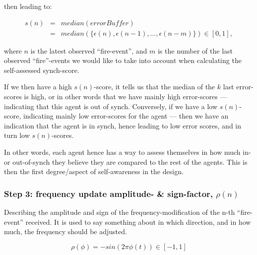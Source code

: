 	then leading to:
	
	\begin{equation}
	\label{self_assessed_synch}
		\begin{array}{rrclcl}
		s(n) & = & median(errorBuffer) \\ 
		& = & median(\{\epsilon(n), \epsilon(n-1), ... , \epsilon(n-m)\}) \in [0, 1],
		\end{array}
	\end{equation} \nl
	
	where $n$ is the latest observed ``fire-event'', and $m$ is the number of the last observed ``fire''-events we would like to take into account when calculating the self-assessed synch-score.
	
	If we then have a high $s(n)$-score, it tells us that the median of the $k$ last error-scores is high, or in other words that we have mainly high error-scores — indicating that this agent is out of synch. Conversely, if we have a low $s(n)$-score, indicating mainly low error-scores for the agent — then we have an indication that the agent is in synch, hence leading to low error scores, and in turn low $s(n)$-scores. 
	
	In other words, each agent hence has a way to assess themselves in how much in- or out-of-synch they believe they are compared to the rest of the agents. This is then the first degree/aspect of  self-awareness in the design.
	
	\subsubsection{Step 3: frequency update amplitude- \& sign-factor, $\rho(n)$}
	
	Describing the amplitude and sign of the frequency-modification of the n-th ``fire-event'' received. It is used to say something about in which direction, and in how much, the frequency should be adjusted.
	
	\begin{equation}
	\label{amp_sign_freq_adj}
		\rho(\phi) = - sin(2\pi\phi(t)) \in [-1, 1]
	\end{equation}
	
